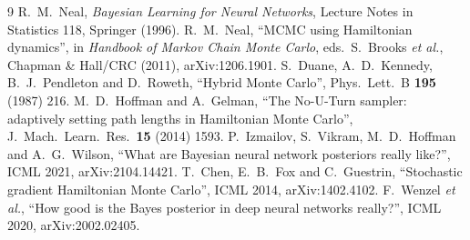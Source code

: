 \documentclass[11pt]{article}
\begin{document}
\begin{thebibliography}{9}
 R.~M.~Neal, \emph{Bayesian Learning for Neural Networks}, Lecture
  Notes in Statistics 118, Springer (1996).
 R.~M.~Neal, ``MCMC using Hamiltonian dynamics'', in \emph{Handbook of
  Markov Chain Monte Carlo}, eds.\ S.~Brooks \emph{et al.}, Chapman \& Hall/CRC (2011),
  arXiv:1206.1901.
 S.~Duane, A.~D.~Kennedy, B.~J.~Pendleton and D.~Roweth, ``Hybrid Monte
  Carlo'', Phys.\ Lett.\ B \textbf{195} (1987) 216.
 M.~D.~Hoffman and A.~Gelman, ``The No-U-Turn sampler: adaptively
  setting path lengths in Hamiltonian Monte Carlo'', J.\ Mach.\ Learn.\ Res.\ \textbf{15}
  (2014) 1593.
 P.~Izmailov, S.~Vikram, M.~D.~Hoffman and A.~G.~Wilson, ``What are
  Bayesian neural network posteriors really like?'', ICML 2021, arXiv:2104.14421.
 T.~Chen, E.~B.~Fox and C.~Guestrin, ``Stochastic gradient Hamiltonian
  Monte Carlo'', ICML 2014, arXiv:1402.4102.
 F.~Wenzel \emph{et al.}, ``How good is the Bayes posterior in deep
  neural networks really?'', ICML 2020, arXiv:2002.02405.
\end{thebibliography}
\end{document}
